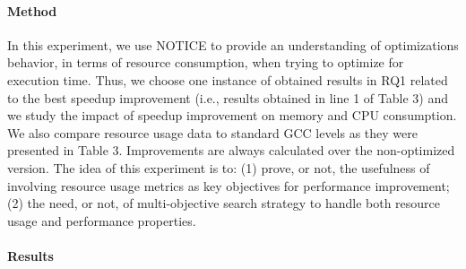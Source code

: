 \paragraph{Method}
In this experiment, we use NOTICE to provide an understanding of optimizations behavior, in terms of resource consumption, when trying to optimize for execution time. Thus, we choose one instance of obtained results in RQ1 related to the best speedup improvement (i.e., results obtained in line 1 of Table 3) and we study the impact of speedup improvement on memory and CPU consumption. We also compare resource usage data to standard GCC levels as they were presented in Table 3. Improvements are always calculated over the non-optimized version. The idea of this experiment is to: (1) prove, or not, the usefulness of involving resource usage metrics as key objectives for performance improvement; (2) the need, or not, of multi-objective search strategy to handle both resource usage and performance properties.



\paragraph{Results}

